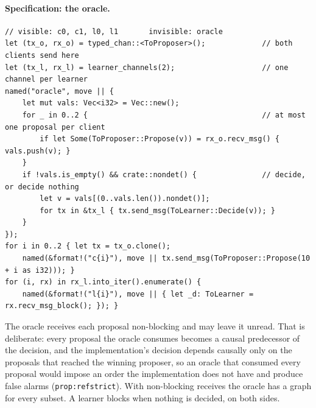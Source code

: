 \documentclass[11pt,a4paper]{article}
\newcommand{\code}[1]{\texttt{#1}}
\begin{document}
\paragraph{Specification: the oracle.}
\begin{lstlisting}
// visible: c0, c1, l0, l1       invisible: oracle
let (tx_o, rx_o) = typed_chan::<ToProposer>();             // both clients send here
let (tx_l, rx_l) = learner_channels(2);                    // one channel per learner
named("oracle", move || {
    let mut vals: Vec<i32> = Vec::new();
    for _ in 0..2 {                                        // at most one proposal per client
        if let Some(ToProposer::Propose(v)) = rx_o.recv_msg() { vals.push(v); }
    }
    if !vals.is_empty() && crate::nondet() {               // decide, or decide nothing
        let v = vals[(0..vals.len()).nondet()];
        for tx in &tx_l { tx.send_msg(ToLearner::Decide(v)); }
    }
});
for i in 0..2 { let tx = tx_o.clone();
    named(&format!("c{i}"), move || tx.send_msg(ToProposer::Propose(10 + i as i32))); }
for (i, rx) in rx_l.into_iter().enumerate() {
    named(&format!("l{i}"), move || { let _d: ToLearner = rx.recv_msg_block(); }); }
\end{lstlisting}
The oracle receives each proposal non-blocking and may leave it unread. That is deliberate:
every proposal the oracle consumes becomes a causal predecessor of the decision, and the
implementation's decision depends causally only on the proposals that reached the winning
proposer, so an oracle that consumed every proposal would impose an order the implementation
does not have and produce false alarms (\code{prop:refstrict}). With non-blocking receives the
oracle has a graph for every subset. A learner blocks when nothing is decided, on both sides.
\end{document}
